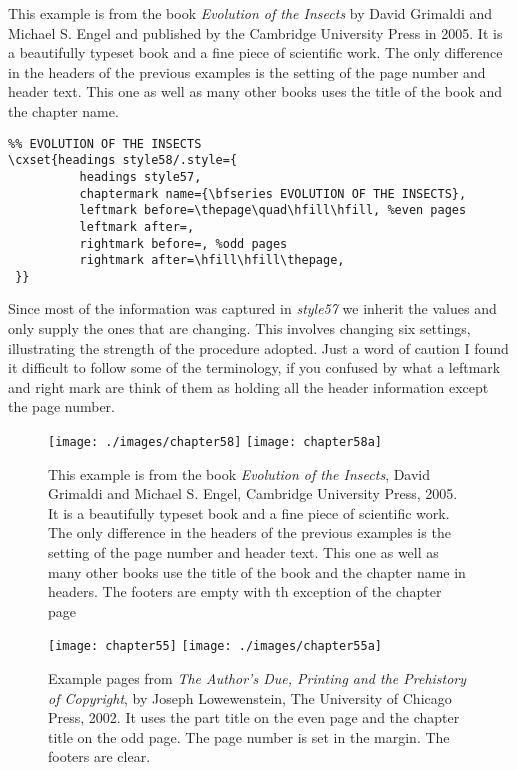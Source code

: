 This example is from the book \textit{Evolution of the Insects} by David Grimaldi and Michael S. Engel and published by the Cambridge University Press in 2005. It is a beautifully typeset book and a fine piece of scientific work. The only difference in the headers of the previous examples is the setting of the page number and header text. This one as well as many other books uses the title of the book and the chapter name.

\begin{tcolorbox}
\begin{lstlisting}
%% EVOLUTION OF THE INSECTS
\cxset{headings style58/.style={
          headings style57,
          chaptermark name={\bfseries EVOLUTION OF THE INSECTS},
          leftmark before=\thepage\quad\hfill\hfill, %even pages
          leftmark after=,
          rightmark before=, %odd pages
          rightmark after=\hfill\hfill\thepage,
 }}
\end{lstlisting}
\end{tcolorbox}

Since most of the information was captured in \textit{style57} we inherit the values and only supply the ones  that are changing. This involves changing six settings, illustrating the strength of the procedure adopted. Just a word of caution I found it difficult to follow some of the terminology, if you confused by what a leftmark and right mark are think of them as holding all the header information except the page number.



\begin{figure}
\centering
\texttt{[image: ./images/chapter58]}\vspace{0.5\baselineskip}
\texttt{[image: chapter58a]}
\caption{This example is from the book \textit{Evolution of the Insects}, David Grimaldi and Michael S. Engel,  Cambridge University Press, 2005. It is a beautifully typeset book and a fine piece of scientific work. The only difference in the headers of the previous examples is the setting of the page number and header text. This one as well as many other books use the title of the book and the chapter name in headers. The footers are empty with th exception of the chapter page}
\end{figure}


\begin{figure}
\centering
\texttt{[image: chapter55]}\vspace{0.5\baselineskip}
\texttt{[image: ./images/chapter55a]}
\caption{Example pages from \textit{The Author's Due, Printing and the Prehistory of Copyright}, by Joseph Lowewenstein, The University of Chicago Press, 2002.  It uses the part title on the even page and the chapter title on the odd page. The page number is set in the margin. The footers are clear.}
\end{figure}



